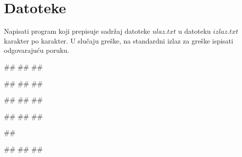 \section{Datoteke}


\begin{Exercise}[label=v3_01] 
Napisati program koji prepisuje sadržaj datoteke $ulaz.txt$ u datoteku $izlaz.txt$ karakter po karakter.
U slučaju greške, na standardni izlaz za greške ispisati odgovarajuću poruku.

\begin{minitest}
\begin{upotreba}{1}
##
##
##

##
##
##
\end{upotreba}
\end{minitest}
\begin{minitest}
\begin{upotreba}{2}
##
##
##

##
##
##
\end{upotreba}
\end{minitest}
\begin{minitest}
\begin{upotreba}{3}
##

#\naslovIzlazZaGresku#
##
##
\end{upotreba}
\end{minitest}
\end{Exercise}
\begin{Answer}[ref=v3_01]
\end{Answer}


